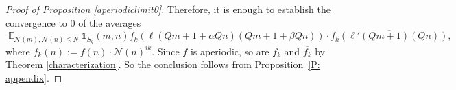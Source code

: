 \documentclass[11pt]{amsart}
\newtheorem{lemma}{Lemma}[section]
\theoremstyle{definition}
\DeclareMathOperator*{\E}{\mathbb{E}}
\newcommand{\NN}{{\mathcal N}}
\renewcommand{\S}{\mathbb{S}}
\begin{document}
\begin{proof}[Proof of Proposition \ref{aperiodiclimit0}]
Therefore, it is enough to establish the convergence to $0$ of the averages
\[
\E_{\NN(m), \NN(n) \leq N} \mathds{1}_{S_q}(m,n)f_k(\ell(Qm+1+\alpha Qn)(Qm+1+\beta Qn))\cdot \overline{f_k(\ell'(Qm+1)(Qn))},
\]
where $f_k(n):=f(n) \cdot \NN(n)^{ik}$.
Since $f$ is aperiodic, so are $f_k$ and $\overline{f_k}$ by Theorem \ref{characterization}. So the conclusion follows from Proposition~\ref{P: appendix}. %
%
%
%
\end{proof}
\end{document}

